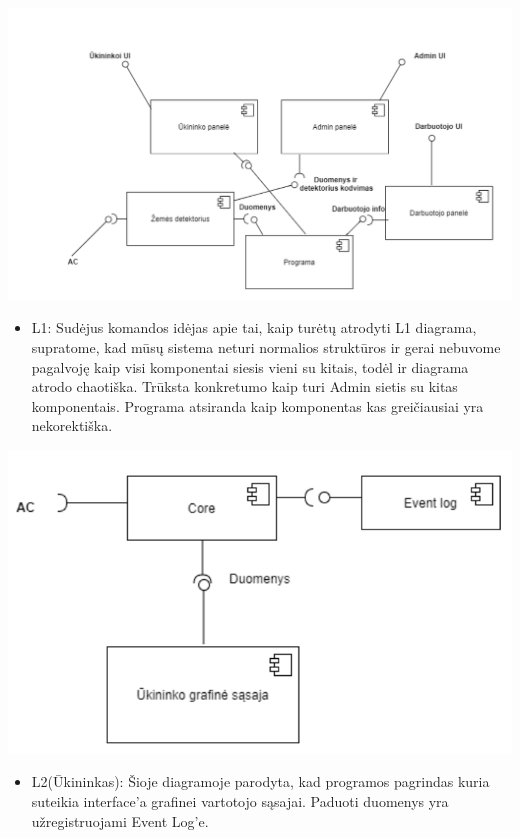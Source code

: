 \documentclass[oneside]{VUMIFPSkursinis}
\begin{document}
\includegraphics[width=\textwidth,height=\textheight,keepaspectratio]{l1.png}	

\begin{itemize}
	\item L1: Sudėjus komandos idėjas apie tai, kaip turėtų atrodyti L1 diagrama, supratome, kad mūsų sistema neturi normalios struktūros ir gerai nebuvome pagalvoję kaip visi komponentai siesis vieni su kitais, todėl ir diagrama atrodo chaotiška. Trūksta konkretumo kaip turi Admin sietis su kitas komponentais. Programa atsiranda kaip komponentas  kas greičiausiai yra nekorektiška.

\end{itemize}
	\includegraphics[width=\textwidth,height=\textheight,keepaspectratio]{l2uki.png}

	\begin{itemize}
		\item L2(Ūkininkas): Šioje diagramoje parodyta, kad programos pagrindas kuria suteikia interface’a grafinei vartotojo sąsajai. Paduoti duomenys yra užregistruojami Event Log’e.

	\end{itemize}
	
\end{document}
